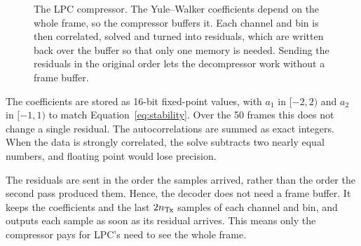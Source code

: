 \begin{figure}[t]
\centering
{}
\caption[LPC three-pass architecture]{The LPC compressor. The Yule--Walker
coefficients depend on the whole frame, so the compressor buffers it. Each
channel and bin is then correlated, solved and turned into residuals, which
are written back over the buffer so that only one memory is needed. Sending the
residuals in the original order lets the decompressor work without a frame
buffer.}
\label{fig:lpcblock}
\end{figure}

The coefficients are stored as 16-bit fixed-point values, with $a_1$ in
$[-2, 2)$ and $a_2$ in $[-1, 1)$ to match Equation~\eqref{eq:stability}. Over
the 50 frames this does not change a single residual. The autocorrelations are
summed as exact integers. When the data is strongly correlated, the solve
subtracts two nearly equal numbers, and floating point would lose precision.

The residuals are sent in the order the samples arrived, rather than the order
the second pass produced them. Hence, the decoder does not need a frame buffer.
It keeps the coefficients and the last $2n_{\mathrm{Tx}}$ samples of each channel and
bin, and outputs each sample as soon as its residual arrives. This means only
the compressor pays for LPC's need to see the whole frame.

